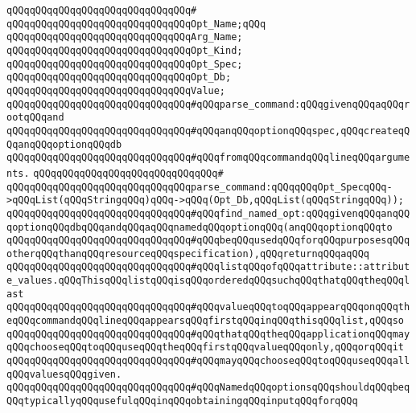 \verb|qQQqqQQqqQQqqQQqqQQqqQQqqQQqqQQq#|\newline
\verb|qQQqqQQqqQQqqQQqqQQqqQQqqQQqqQQqOpt_Name;qQQq|\newline
\verb|qQQqqQQqqQQqqQQqqQQqqQQqqQQqqQQqArg_Name;|\newline
\verb|qQQqqQQqqQQqqQQqqQQqqQQqqQQqqQQqOpt_Kind;|\newline
\verb|qQQqqQQqqQQqqQQqqQQqqQQqqQQqqQQqOpt_Spec;|\newline
\verb|qQQqqQQqqQQqqQQqqQQqqQQqqQQqqQQqOpt_Db;|\newline
\verb|qQQqqQQqqQQqqQQqqQQqqQQqqQQqqQQqValue;|\newline
\newline
\verb|qQQqqQQqqQQqqQQqqQQqqQQqqQQqqQQq#qQQqparse_command:qQQqgivenqQQqaqQQqrootqQQqand|\newline
\verb|qQQqqQQqqQQqqQQqqQQqqQQqqQQqqQQq#qQQqanqQQqoptionqQQqspec,qQQqcreateqQQqanqQQqoptionqQQqdb|\newline
\verb|qQQqqQQqqQQqqQQqqQQqqQQqqQQqqQQq#qQQqfromqQQqcommandqQQqlineqQQqarguments.|\newline
\verb|qQQqqQQqqQQqqQQqqQQqqQQqqQQqqQQq#|\newline
\verb|qQQqqQQqqQQqqQQqqQQqqQQqqQQqqQQqparse_command:qQQqqQQqOpt_SpecqQQq->qQQqList(qQQqStringqQQq)qQQq->qQQq(Opt_Db,qQQqList(qQQqStringqQQq));|\newline
\newline
\verb|qQQqqQQqqQQqqQQqqQQqqQQqqQQqqQQq#qQQqfind_named_opt:qQQqgivenqQQqanqQQqoptionqQQqdbqQQqandqQQqaqQQqnamedqQQqoptionqQQq(anqQQqoptionqQQqto|\newline
\verb|qQQqqQQqqQQqqQQqqQQqqQQqqQQqqQQq#qQQqbeqQQqusedqQQqforqQQqpurposesqQQqotherqQQqthanqQQqresourceqQQqspecification),qQQqreturnqQQqaqQQq|\newline
\verb|qQQqqQQqqQQqqQQqqQQqqQQqqQQqqQQq#qQQqlistqQQqofqQQqattribute::attribute_values.qQQqThisqQQqlistqQQqisqQQqorderedqQQqsuchqQQqthatqQQqtheqQQqlast|\newline
\verb|qQQqqQQqqQQqqQQqqQQqqQQqqQQqqQQq#qQQqvalueqQQqtoqQQqappearqQQqonqQQqtheqQQqcommandqQQqlineqQQqappearsqQQqfirstqQQqinqQQqthisqQQqlist,qQQqso|\newline
\verb|qQQqqQQqqQQqqQQqqQQqqQQqqQQqqQQq#qQQqthatqQQqtheqQQqapplicationqQQqmayqQQqchooseqQQqtoqQQquseqQQqtheqQQqfirstqQQqvalueqQQqonly,qQQqorqQQqit|\newline
\verb|qQQqqQQqqQQqqQQqqQQqqQQqqQQqqQQq#qQQqmayqQQqchooseqQQqtoqQQquseqQQqallqQQqvaluesqQQqgiven.|\newline
\verb|qQQqqQQqqQQqqQQqqQQqqQQqqQQqqQQq#qQQqNamedqQQqoptionsqQQqshouldqQQqbeqQQqtypicallyqQQqusefulqQQqinqQQqobtainingqQQqinputqQQqforqQQq|\newline
